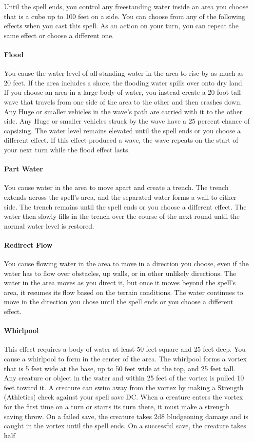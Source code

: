 \documentclass[a5paper, 12pt]{memoir}
\begin{document}
\vspace{1\baselineskip}\noindent Until the spell ends, you control any freestanding water inside an area you choose that is a cube up to 100 feet on a side. You can choose from any of the following effects when you cast this spell. As an action on your turn, you can repeat the same effect or choose a different one. \paragraph{Flood} You cause the water level of all standing water in the area to rise by as much as 20 feet. If the area includes a shore, the flooding water spills over onto dry land. If you choose an area in a large body of water, you instead create a 20-foot tall wave that travels from one side of the area to the other and then crashes down. Any Huge or smaller vehicles in the wave's path are carried with it to the other side. Any Huge or smaller vehicles struck by the wave have a 25 percent chance of capsizing. The water level remains elevated until the spell ends or you choose a different effect. If this effect produced a wave, the wave repeats on the start of your next turn while the flood effect lasts. \paragraph{Part Water} You cause water in the area to move apart and create a trench. The trench extends across the spell's area, and the separated water forms a wall to either side. The trench remains until the spell ends or you choose a different effect. The water then slowly fills in the trench over the course of the next round until the normal water level is restored. \paragraph{Redirect Flow} You cause flowing water in the area to move in a direction you choose, even if the water has to flow over obstacles, up walls, or in other unlikely directions. The water in the area moves as you direct it, but once it moves beyond the spell's area, it resumes its flow based on the terrain conditions. The water continues to move in the direction you chose until the spell ends or you choose a different effect. \paragraph{Whirlpool} This effect requires a body of water at least 50 feet square and 25 feet deep. You cause a whirlpool to form in the center of the area. The whirlpool forms a vortex that is 5 feet wide at the base, up to 50 feet wide at the top, and 25 feet tall. Any creature or object in the water and within 25 feet of the vortex is pulled 10 feet toward it. A creature can swim away from the vortex by making a Strength (Athletics) check against your spell save DC. When a creature enters the vortex for the first time on a turn or starts its turn there, it must make a strength saving throw. On a failed save, the creature takes 2d8 bludgeoning damage and is caught in the vortex until the spell ends. On a successful save, the creature takes half 
\end{document}
